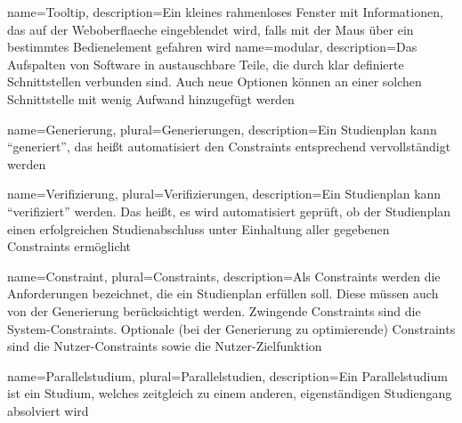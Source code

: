 {
	name=Tooltip,
	description={Ein kleines rahmenloses Fenster mit Informationen, das auf der \gls{Weboberflaeche} eingeblendet wird, falls mit der Maus über ein bestimmtes Bedienelement gefahren wird}
}
{
	name=modular,
	description={Das Aufspalten von Software in austauschbare Teile, die durch klar definierte Schnittstellen verbunden sind. Auch neue Optionen können an einer solchen Schnittstelle mit wenig Aufwand hinzugefügt werden}
}
	
{
	name=Generierung,
	plural=Generierungen,
	description={Ein \gls{Studienplan} kann \enquote{generiert}, das heißt automatisiert den \glspl{Constraint} entsprechend vervollständigt werden}
}

{
name=Verifizierung,
plural=Verifizierungen,
description={Ein \gls{Studienplan} kann \enquote{verifiziert} werden. Das heißt, es wird automatisiert geprüft, ob der Studienplan einen erfolgreichen Studienabschluss unter Einhaltung aller gegebenen \glspl{Constraint} ermöglicht}
}

{
name=Constraint,
plural=Constraints,
description={Als Constraints werden die Anforderungen bezeichnet, die ein \gls{Studienplan} erfüllen soll. Diese müssen auch von der \gls{Generierung} berücksichtigt werden. Zwingende Constraints sind die \glspl{System-Constraint}. Optionale (bei der \gls{Generierung} zu optimierende) Constraints sind die \glspl{Nutzer-Constraint} sowie die \gls{Nutzer-Zielfunktion}}
}



{
name=Parallelstudium,
plural=Parallelstudien,
description={Ein Parallelstudium ist ein Studium, welches zeitgleich zu einem anderen, eigenständigen Studiengang absolviert wird}
}